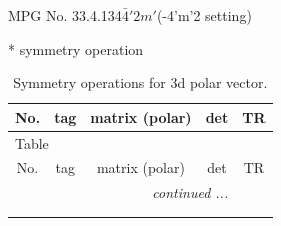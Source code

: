 \documentclass[fleqn,8pt]{jsarticle}
\begin{document}
\setcounter{MaxMatrixCols}{32}

\renewcommand{\tablename}{Table~}
\renewcommand{\figurename}{Figure~}
\begin{center}
\LARGE
MPG No. 33.4.134\quad$\bar{4}'2m'$\quad(-4'm'2 setting)
\end{center}
* symmetry operation
\renewcommand{\arraystretch}{1.3}
\begin{longtable}{ccccc}
\caption{Symmetry operations for 3d polar vector.}
 \\
 \hline \hline
No. & tag & matrix (polar) & det & TR \\ \hline \endfirsthead

\multicolumn{4}{l}{\tablename\ \thetable{}} \\
 \hline \hline
No. & tag & matrix (polar) & det & TR \\ \hline \endhead

 \hline \hline
\multicolumn{4}{r}{\footnotesize\it continued ...} \\ \endfoot

 \hline \hline
\multicolumn{4}{r}{} \\ \endlastfoot


\end{longtable}
\end{document}
